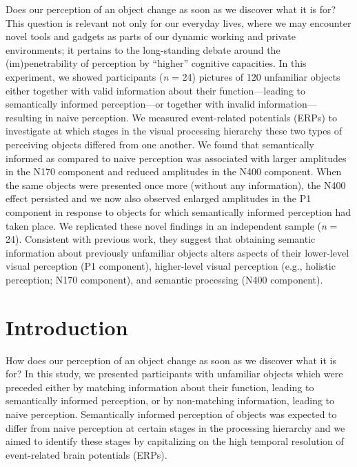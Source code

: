 \documentclass[
  english,
  doc,12pt,twoside,floatsintext]{apa7}
\begin{document}
Does our perception of an object change as soon as we discover what it is for? This question is relevant not only for our everyday lives, where we may encounter novel tools and gadgets as parts of our dynamic working and private environments; it pertains to the long-standing debate around the (im)penetrability of perception by ``higher'' cognitive capacities. In this experiment, we showed participants (\emph{n} = 24) pictures of 120 unfamiliar objects either together with valid information about their function---leading to semantically informed perception---or together with invalid information---resulting in naive perception. We measured event-related potentials (ERPs) to investigate at which stages in the visual processing hierarchy these two types of perceiving objects differed from one another. We found that semantically informed as compared to naive perception was associated with larger amplitudes in the N170 component and reduced amplitudes in the N400 component. When the same objects were presented once more (without any information), the N400 effect persisted and we now also observed enlarged amplitudes in the P1 component in response to objects for which semantically informed perception had taken place. We replicated these novel findings in an independent sample (\emph{n} = 24). Consistent with previous work, they suggest that obtaining semantic information about previously unfamiliar objects alters aspects of their lower-level visual perception (P1 component), higher-level visual perception (e.g., holistic perception; N170 component), and semantic processing (N400 component).

\newpage

\hypertarget{introduction}{%
\section{Introduction}\label{introduction}}

How does our perception of an object change as soon as we discover what it is for? In this study, we presented participants with unfamiliar objects which were preceded either by matching information about their function, leading to semantically informed perception, or by non-matching information, leading to naive perception. Semantically informed perception of objects was expected to differ from naive perception at certain stages in the processing hierarchy and we aimed to identify these stages by capitalizing on the high temporal resolution of event-related brain potentials (ERPs).
\end{document}
